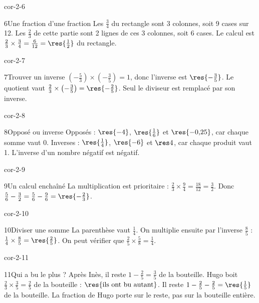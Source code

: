 \begin{blocLivre}{cor-2-6}\begin{corrige}{6}{Une fraction d’une fraction}
Les $\frac34$ du rectangle sont 3 colonnes, soit 9 cases sur 12. Les $\frac23$ de cette partie sont 2 lignes de ces 3 colonnes, soit 6 cases. Le calcul est $\frac23\times\frac34=\frac6{12}=\res{\frac12}$ du rectangle.
\label{fig-cor-2-6}
\end{corrige}\end{blocLivre}
\begin{blocLivre}{cor-2-7}\begin{corrige}{7}{Trouver un inverse}
$\left(-\frac53\right)\times\left(-\frac35\right)=1$, donc l’inverse est $\res{-\frac35}$. Le quotient vaut $\frac23\times\left(-\frac35\right)=\res{-\frac25}$. Seul le diviseur est remplacé par son inverse.
\end{corrige}\end{blocLivre}
\begin{blocLivre}{cor-2-8}\begin{corrige}{8}{Opposé ou inverse}
Opposés : $\res{-4}$, $\res{\frac16}$ et $\res{-0{,}25}$, car chaque somme vaut 0. Inverses : $\res{\frac14}$, $\res{-6}$ et $\res4$, car chaque produit vaut 1. L’inverse d’un nombre négatif est négatif.
\end{corrige}\end{blocLivre}
\begin{blocLivre}{cor-2-9}\begin{corrige}{9}{Un calcul enchaîné}
La multiplication est prioritaire : $\frac23\times\frac94=\frac{18}{12}=\frac32$. Donc $\frac56-\frac32=\frac56-\frac96=\res{-\frac23}$.
\end{corrige}\end{blocLivre}
\begin{blocLivre}{cor-2-10}\begin{corrige}{10}{Diviser une somme}
La parenthèse vaut $\frac14$. On multiplie ensuite par l’inverse $\frac85$ : $\frac14\times\frac85=\res{\frac25}$. On peut vérifier que $\frac25\times\frac58=\frac14$.
\end{corrige}\end{blocLivre}
\begin{blocLivre}{cor-2-11}\begin{corrige}{11}{Qui a bu le plus ?}
Après Inès, il reste $1-\frac25=\frac35$ de la bouteille. Hugo boit $\frac23\times\frac35=\frac25$ de la bouteille : $\res{\text{ils ont bu autant}}$. Il reste $1-\frac25-\frac25=\res{\frac15}$ de la bouteille. La fraction de Hugo porte sur le reste, pas sur la bouteille entière.
\end{corrige}\end{blocLivre}
